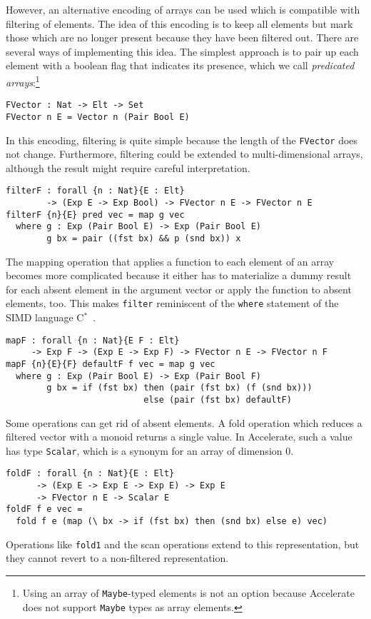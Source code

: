 \documentclass{llncs}
\begin{document}
However, an alternative encoding of arrays can be
used which is compatible with filtering of elements. The idea of this
encoding is to keep all elements but mark those which are no longer
present because they have been filtered out.
There are several ways of implementing this idea. The simplest
approach is to pair up each element with a boolean flag that indicates
its presence, which we call \emph{predicated arrays}:\footnote{Using an array of \texttt{Maybe}-typed elements is not an option
  because Accelerate does not support \texttt{Maybe} types as array elements.}
\begin{verbatim}
FVector : Nat -> Elt -> Set
FVector n E = Vector n (Pair Bool E)
\end{verbatim}

In this encoding, filtering is quite simple because the length of
the \texttt{FVector} does not change. Furthermore, filtering could be
extended to multi-dimensional arrays, although the result might
require careful interpretation.
\begin{verbatim}
filterF : forall {n : Nat}{E : Elt}
        -> (Exp E -> Exp Bool) -> FVector n E -> FVector n E
filterF {n}{E} pred vec = map g vec
  where g : Exp (Pair Bool E) -> Exp (Pair Bool E)
        g bx = pair ((fst bx) && p (snd bx)) x
\end{verbatim}
The mapping operation that applies a function to each element of an
array becomes more complicated because it either has to 
materialize a dummy result for each absent element in the argument
vector or apply the function to absent elements, too. This makes \texttt{filter} reminiscent of the \texttt{where} statement of the SIMD language C$^*$~\cite{rose-etal:c-star}.
\begin{verbatim}
mapF : forall {n : Nat}{E F : Elt}
     -> Exp F -> (Exp E -> Exp F) -> FVector n E -> FVector n F
mapF {n}{E}{F} defaultF f vec = map g vec
  where g : Exp (Pair Bool E) -> Exp (Pair Bool F)
        g bx = if (fst bx) then (pair (fst bx) (f (snd bx)))
                           else (pair (fst bx) defaultF)
\end{verbatim}
Some operations can get rid of absent
elements. A fold operation which reduces a filtered
vector with a monoid returns a single value. In Accelerate, such a value has type
\texttt{Scalar}, which is a synonym for an array of dimension $0$.
\begin{verbatim}
foldF : forall {n : Nat}{E : Elt}
      -> (Exp E -> Exp E -> Exp E) -> Exp E
      -> FVector n E -> Scalar E
foldF f e vec =
  fold f e (map (\ bx -> if (fst bx) then (snd bx) else e) vec)
\end{verbatim}
Operations like \texttt{fold1} and the scan operations
extend to this representation, but they
cannot revert to a
non-filtered representation. 
\end{document}

